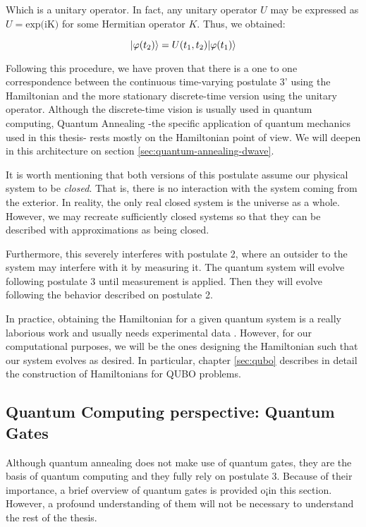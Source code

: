 Which is a unitary operator. In fact, any unitary operator $U$ may be expressed as $U = \text{exp(iK)}$ for some Hermitian operator $K$. Thus, we obtained: 

$$ |\varphi(t_2)\rangle = U(t_1, t_2) |\varphi(t_1)\rangle $$

Following this procedure, we have proven that there is a one to one correspondence between the continuous time-varying postulate 3' using the Hamiltonian and the more stationary discrete-time version using the unitary operator. Although the discrete-time vision is usually used in quantum computing, Quantum Annealing -the specific application of quantum mechanics used in this thesis- rests mostly on the Hamiltonian point of view. We will deepen in this architecture on section \ref{sec:quantum-annealing-dwave}.

It is worth mentioning that both versions of this postulate assume our physical system to be \emph{closed}. That is, there is no interaction with the system coming from the exterior. In reality, the only real closed system is the universe as a whole. However, we may recreate sufficiently closed systems so that they can be described with approximations as being closed. 

Furthermore, this severely interferes with postulate 2, where an outsider to the system may interfere with it by measuring it. The quantum system will evolve following postulate 3 until measurement is applied. Then they will evolve following the behavior described on postulate 2.

In practice, obtaining the Hamiltonian for a given quantum system is a really laborious work and usually needs experimental data \cite{Nielsen2002}. However, for our computational purposes, we will be the ones designing the Hamiltonian such that our system evolves as desired. In particular, chapter \ref{sec:qubo} describes in detail the construction of Hamiltonians for QUBO problems.

\subsection{Quantum Computing perspective: Quantum Gates}

Although quantum annealing does not make use of quantum gates, they are the basis of quantum computing and they fully rely on postulate 3. Because of their importance, a brief overview of quantum gates is provided o¡in this section. However, a profound understanding of them will not be necessary to understand the rest of the thesis.

